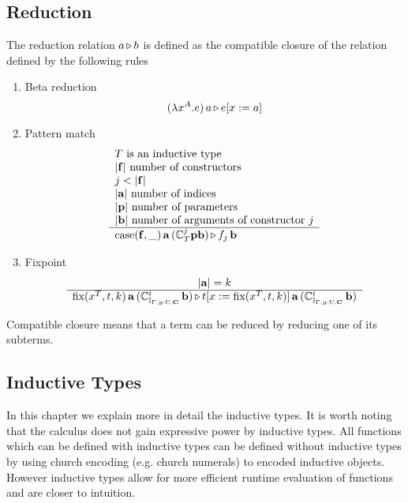 





\subsection{Reduction}
\label{sec:reduction}

\begin{definition}
  The reduction relation $a {\,\triangleright\,} b$ is defined as the compatible closure of
  the relation defined by the following rules
  \begin{enumerate}

  \item Beta reduction
    $$
    (\lambda x^A.e)\,a {\,\triangleright\,} e[x:=a]
    $$

  \item Pattern match
    $$
    \begin{array}{l} 
        T \text{ is an inductive type}
        \\
        |\mathbf{f}| \text{ number of constructors}
        \\
        j < |\mathbf{f}|
        \\
        |\mathbf{a}| \text{ number of indices}
        \\
        |\mathbf{p}| \text{ number of parameters}
        \\
        |\mathbf{b}| \text{ number of arguments of constructor } j
     \\ \hline 
        \text{case}(\mathbf{f}, \_)\, \mathbf{a} \, (\mathbb{C}^j_T \mathbf{p} \mathbf{b})
        {\,\triangleright\,}
        f_j \, \mathbf{b}
    \end{array}
    $$


  \item Fixpoint
    $$
    \begin{array}{c} |\mathbf{a}| = k \\ \hline 
      \text{fix}(x^T, t, k) \,
      \mathbf{a} \,
      (\mathbb{C}^i_{\mathbb{I}_{\Gamma,y:U,\mathbf{C}}} \, \mathbf{b})
      {\,\triangleright\,}
      t[x := \text{fix}(x^T, t, k)] \,
      \mathbf{a} \,
      (\mathbb{C}^i_{\mathbb{I}_{\Gamma,y:U,\mathbf{C}}} \, \mathbf{b})
    \end{array}
    $$
  \end{enumerate}
  Compatible closure means that a term can be reduced by reducing one of its
  subterms.
\end{definition}





\subsection{Inductive Types}
\label{sec:inductive-types}


In this chapter we explain more in detail the inductive types. It is worth
noting that the calculus does not gain expressive power by inductive
types. All functions which can be defined with inductive types can be defined
without inductive types by using church encoding (e.g. church numerals) to
encoded inductive objects. However inductive types allow for more efficient
runtime evaluation of functions and are closer to intuition.


